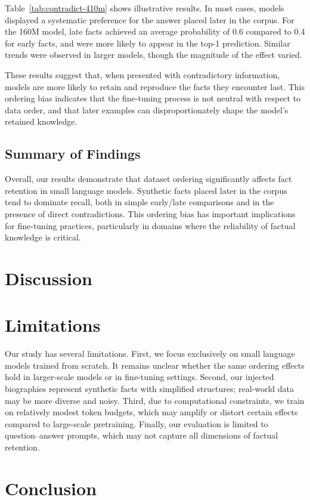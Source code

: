 \documentclass[11pt]{article}
\begin{document}
Table~\ref{tab:contradict-410m} shows illustrative results. In most cases, models displayed a systematic preference for the answer placed later in the corpus. For the 160M model, late facts achieved an average probability of 0.6 compared to 0.4 for early facts, and were more likely to appear in the top-1 prediction. Similar trends were observed in larger models, though the magnitude of the effect varied.

These results suggest that, when presented with contradictory information, models are more likely to retain and reproduce the facts they encounter last. This ordering bias indicates that the fine-tuning process is not neutral with respect to data order, and that later examples can disproportionately shape the model’s retained knowledge.

\subsection{Summary of Findings}
Overall, our results demonstrate that dataset ordering significantly affects fact retention in small language models. Synthetic facts placed later in the corpus tend to dominate recall, both in simple early/late comparisons and in the presence of direct contradictions. This ordering bias has important implications for fine-tuning practices, particularly in domains where the reliability of factual knowledge is critical.




\section{Discussion}

\section{Limitations}
Our study has several limitations. First, we focus exclusively on small language models trained from scratch. It remains unclear whether the same ordering effects hold in larger-scale models or in fine-tuning settings. Second, our injected biographies represent synthetic facts with simplified structures; real-world data may be more diverse and noisy. Third, due to computational constraints, we train on relatively modest token budgets, which may amplify or distort certain effects compared to large-scale pretraining. Finally, our evaluation is limited to question–answer prompts, which may not capture all dimensions of factual retention.

\section{Conclusion}



\end{document}
